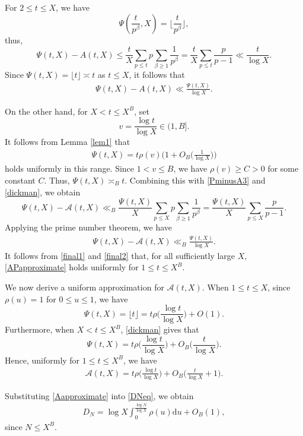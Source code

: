 \documentclass[12pt,reqno]{amsart}
\theoremstyle{definition}
\numberwithin{equation}{section}
\newcommand{\Bg}{\Big}
\newcommand{\mca}{\mathcal{A}}
\newcommand{\mmd}{\mathrm{d}}
\begin{document}
For \(2\le t\le X\), we have
\[
\Psi\left(\frac{t}{p^\beta},X\right) = \Bg\lfloor\frac{t}{p^\beta}\Bg\rfloor,
\]
thus, 
\[
\Psi(t,X)-A(t,X) \le\frac{t}{X}\sum_{p\le t}p\sum_{\beta\ge1}\frac1{p^\beta} 
= \frac{t}{X}\sum_{p \le t}\frac{p}{p-1} \ll \frac{t}{\log X}.
\]
Since \(\Psi(t,X) = \lfloor t \rfloor \asymp t\) as \(t \le X\), it follows that
\begin{align}
    \label{final1}
    \Psi(t,X)-A(t,X)\ll\frac{\Psi(t,X)}{\log X}.
\end{align}

On the other hand, for \(X<t\le X^B\), set
\[
v=\frac{\log t}{\log X}\in(1,B].
\]
It follows from Lemma \ref{lem1} that
\begin{align}
    \label{dickman}
    \Psi(t,X) = t\rho(v) \Bg(1+O_B\Bg(\frac{1}{\log X}\Bg)\Bg)
\end{align}
holds uniformly in this range. Since \(1 < v \le B\), we have \(\rho(v) \ge C >0\) for some constant \(C\). Thus, \(\Psi(t,X) \asymp_B t\). Combining this with \eqref{PminusA3} and \eqref{dickman}, we obtain
\[
\Psi(t,X) - \mca(t,X) \ll_B \frac{\Psi(t,X)}{X} \sum_{p \le X}p \sum_{\beta \ge 1}\frac{1}{p^\beta} = \frac{\Psi(t,X)}{X}\sum_{p \le X} \frac{p}{p-1}.
\]
Applying the prime number theorem, we have
\begin{align}
    \label{final2}
    \Psi(t,X) - \mca(t,X) \ll_B\frac{\Psi(t,X)}{\log X}.
\end{align}
It follows from \eqref{final1} and \eqref{final2} that, for all sufficiently large \(X\), \eqref{APapproximate} holds uniformly for \(1 \le t \le X^B\). 

We now derive a uniform approximation for \(\mca(t,X)\). When \(1\le t\le X\), since \(\rho(u)=1\) for \(0\le u\le1\), we have
\[
\Psi(t,X)=\lfloor t\rfloor=t\rho\Bg(\frac{\log t}{\log X}\Bg)+O(1).
\]
Furthermore, when \(X<t\le X^B\), \eqref{dickman} gives that 
\[
\Psi(t,X)=t\rho\Bg(\frac{\log t}{\log X}\Bg)+O_B\Bg(\frac{t}{\log X}\Bg).
\]
Hence, uniformly for \(1\le t\le X^B\), we have
\begin{align}
    \label{Aapproximate}
    \mca(t,X)=t\rho\Bg(\frac{\log t}{\log X}\Bg)+O_B\Bg(\frac{t}{\log X}+1\Bg).
\end{align}

Substituting \eqref{Aapproximate} into \eqref{DNeq}, we obtain
\begin{align}
    \label{Dfinal}
    D_N = \log X\int_0^{\frac{\log N}{\log X}}\rho(u) \mmd u +O_B(1),
\end{align}
since \(N \le X^B\).
\end{document}
